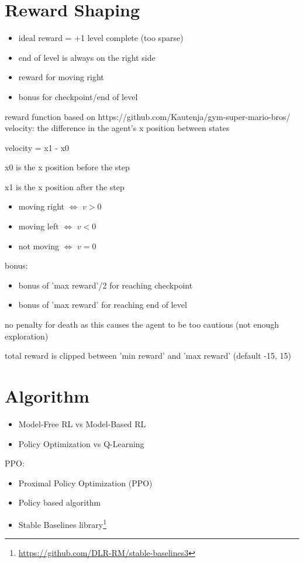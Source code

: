 \documentclass{article}
\begin{document}
    \section{Reward Shaping}
    \begin{itemize}
        \item ideal reward = +1 level complete (too sparse)
        \item end of level is always on the right side
        \item reward for moving right
        \item bonus for checkpoint/end of level
    \end{itemize}
    reward function based on https://github.com/Kautenja/gym-super-mario-bros/
    velocity: the difference in the agent's x position between states

    velocity = x1 - x0

    x0 is the x position before the step

    x1 is the x position after the step

    \begin{itemize}
        \item moving right $\Leftrightarrow$ $v > 0$
        \item moving left $\Leftrightarrow$ $v < 0$
        \item not moving $\Leftrightarrow$ $v = 0$
    \end{itemize}
    bonus:
    \begin{itemize}
        \item bonus of 'max reward'/2 for reaching checkpoint
        \item bonus of 'max reward' for reaching end of level
    \end{itemize}
    no penalty for death as this causes the agent to be too cautious (not enough exploration)

    total reward is clipped between 'min reward' and 'max reward' (default -15, 15)

    \section{Algorithm}
    \begin{itemize}
        \item Model-Free RL vs Model-Based RL
        \item Policy Optimization vs Q-Learning
    \end{itemize}
    PPO:
    \begin{itemize}
        \item Proximal Policy Optimization (PPO)\cite{schulman2017proximal}
        \item Policy based algorithm
        \item Stable Baselines library\footnote{\url{https://github.com/DLR-RM/stable-baselines3}}
    \end{itemize}
\end{document}
